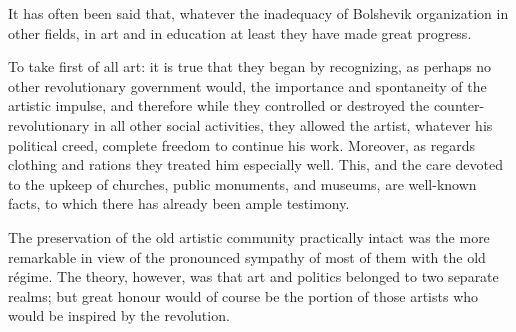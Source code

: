 It has often been said that, whatever the inadequacy of Bolshevik organization in other fields, in art and in education at least they have made great progress.

To take first of all art: it is true that they began by recognizing, as perhaps no other revolutionary government would, the importance and spontaneity of the artistic impulse, and therefore while they controlled or destroyed the counter-revolutionary in all other social activities, they allowed the artist, whatever his political creed, complete freedom to continue his work. Moreover, as regards clothing and rations they treated him especially well. This, and the care devoted to the upkeep of churches, public monuments, and museums, are well-known facts, to which there has already been ample testimony.

The preservation of the old artistic community practically intact was the more remarkable in view of the pronounced sympathy of most of them with the old régime. The theory, however, was that art and politics belonged to two separate realms; but great honour would of course be the portion of those artists who would be inspired by the revolution.

